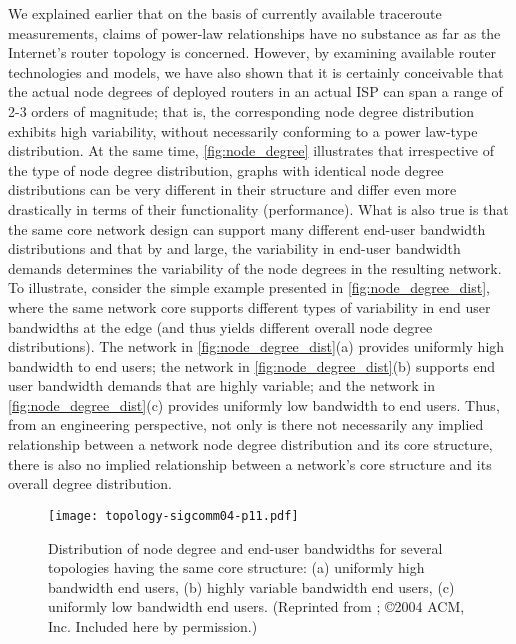 We explained earlier that on the basis of currently available traceroute
measurements, claims of power-law relationships have no substance as far as
the Internet's router topology is concerned.  However, by examining available
router technologies and models, we have also shown that it is certainly conceivable 
that the actual node degrees of deployed routers in an actual ISP can span a range 
of 2-3 orders of magnitude; that is, the corresponding node degree distribution exhibits 
high variability, without necessarily conforming to a power law-type distribution. 
At the same time, \autoref{fig:node_degree} illustrates that irrespective of the type of node degree
distribution, graphs with identical node degree distributions can be very different 
in their structure and differ even more drastically in terms of their functionality
(\eg performance). What is also true is that the same core network design can 
support many different end-user bandwidth distributions and that by and large, 
the variability in end-user bandwidth demands determines the variability of the 
node degrees in the resulting network. To illustrate, consider the simple example
presented in \autoref{fig:node_degree_dist}, where the same network core supports different types of 
variability in end user bandwidths at the edge (and thus yields different overall 
node degree distributions). The network in \autoref{fig:node_degree_dist}(a) provides uniformly high 
bandwidth to end users; the network in \autoref{fig:node_degree_dist}(b) supports end user bandwidth 
demands that are highly variable; and the network in \autoref{fig:node_degree_dist}(c) provides uniformly low bandwidth to end users. Thus, from an engineering perspective, not only 
is there not necessarily any implied relationship between a network node degree 
distribution and its core structure, there is also no implied relationship between 
a network's core structure and its overall degree distribution. 

\begin{figure}[btph] 
  \begin{center}
    \texttt{[image: topology-sigcomm04-p11.pdf]}
     \caption{Distribution of node degree and end-user bandwidths for
       several topologies having the same core structure: (a)
       uniformly high bandwidth end users, (b) highly variable
       bandwidth end users, (c) uniformly low bandwidth end
       users. 
       (Reprinted from  \cite{Li04}; \copyright 2004 ACM, Inc. Included here by permission.)
       \label{fig:node_degree_dist}}
  \end{center}
\end{figure}         

